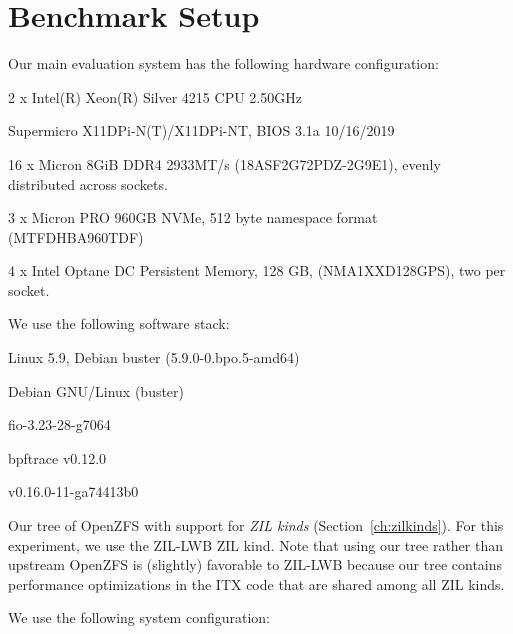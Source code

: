 \documentclass[12pt,a4paper,twoside]{book}
\begin{document}
\section{Benchmark Setup}\label{ch:lwb_analysis:setup}
Our main evaluation system has the following hardware configuration:
\begin{description}[noitemsep,leftmargin=1.5cm,labelindent=1cm]
    \item[CPU] 2 x Intel(R) Xeon(R) Silver 4215 CPU \@ 2.50GHz
    \item[Mainboard] Supermicro X11DPi-N(T)/X11DPi-NT, BIOS 3.1a 10/16/2019
    \item[DRAM] 16 x Micron 8GiB DDR4 2933MT/s (18ASF2G72PDZ-2G9E1), evenly distributed across sockets.
    \item[NVMe] 3 x Micron PRO 960GB NVMe, 512 byte namespace format (MTFDHBA960TDF)
    \item[PMEM] 4 x Intel Optane DC Persistent Memory, 128 GB, (NMA1XXD128GPS), two per socket.
\end{description}
We use the following software stack:
\begin{description}[noitemsep,leftmargin=1.5cm,labelindent=1cm]
    \item[Kernel] Linux 5.9, Debian buster (5.9.0-0.bpo.5-amd64)
    \item[Userland] Debian GNU/Linux (buster)
    \item[fio] fio-3.23-28-g7064
    \item[bpftrace] bpftrace v0.12.0
    \item[bcc] v0.16.0-11-ga74413b0
    \item[OpenZFS] Our tree of OpenZFS with support for \textit{ZIL kinds} (Section~\ref{ch:zilkinds}).
        For this experiment, we use the ZIL-LWB ZIL kind.
        Note that using our tree rather than upstream OpenZFS is (slightly) favorable to ZIL-LWB because our tree contains performance optimizations in the ITX code that are shared among all ZIL kinds.
\end{description}
We use the following system configuration:
\end{document}
